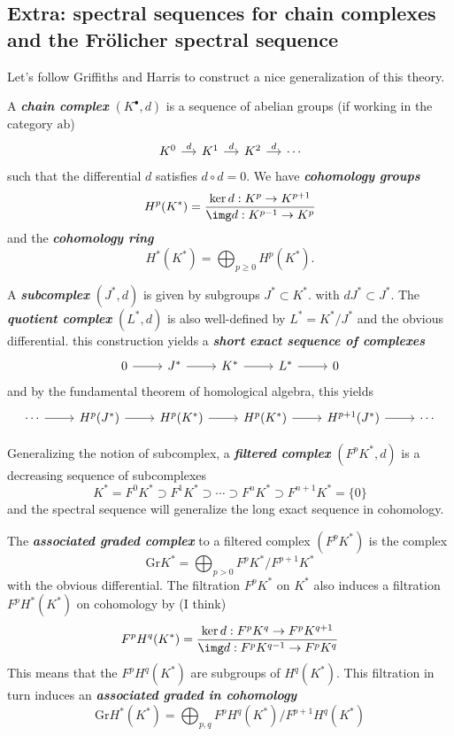 \begin{remark}
\begin{definition}
\subsection{Extra: spectral sequences for chain complexes and the Fr\"olicher spectral sequence}
Let's follow Griffiths and Harris to construct a nice generalization of this theory.

A \textit{\textbf{chain complex}} $(K^\bullet,d)$ is a sequence of abelian groups (if working in the category $\text{ab}$)
\[\begin{tikzcd}[column sep=small]
	K^{0}\arrow[r,"d"]&K^{1}\arrow[r,"d"]&K^2\arrow[r,"d"]&\cdots
\end{tikzcd}\]
such that the differential $d$ satisfies $d\circ d=0$. We have \textit{\textbf{cohomology groups}} 
\[H^{p}(K^*)=\frac{\ker d:K^p\to K^{p+1}}{\img d:K^{p-1}\to K^p}\]
and the \textit{\textbf{cohomology ring}}
\[H^{*}(K^*)=\bigoplus_{p\geq 0} H^{p}(K^*).\]

A \textit{\textbf{subcomplex}} $(J^*,d)$ is given by subgroups $J^*\subset K^*$. with $dJ^*\subset J^*$. The \textit{\textbf{quotient complex}} $(L^*,d)$ is also well-defined by $L^*=K^*/J^*$ and the obvious differential. this construction yields a \textit{\textbf{short exact sequence of complexes}}
\[\begin{tikzcd}
	0\arrow[r]&J^*\arrow[r]&K^*\arrow[r]&L^*\arrow[r]&0
\end{tikzcd}\]
and by the fundamental theorem of homological algebra, this yields
\[\begin{tikzcd}
	\cdots\arrow[r]&H^{p}(J^*)\arrow[r]&H^{p}(K^*)\arrow[r]&H^{p}(K^*)\arrow[r]&H^{p+1}(J^*)\arrow[r]&\cdots
\end{tikzcd}\]

Generalizing the notion of subcomplex, a \textit{\textbf{filtered complex}} $(F^pK^*,d)$ is a decreasing sequence of subcomplexes
\[K^*=F^0K^*\supset F^1K^*\supset\cdots\supset F^nK^*\supset F^{n+1}K^*=\{0\}\]
and the spectral sequence will generalize the long exact sequence in cohomology.

The \textit{\textbf{associated graded complex}} to a filtered complex $ (F^pK^*)$ is the complex
\[\text{Gr}K^*=\bigoplus_{p>0} F^pK^*/F^{p+1}K^* \]
with the obvious differential. The filtration $F^pK^*$ on $K^*$ also induces a filtration $F^pH^*(K^*)$ on cohomology by {\color{blue}(I think)}
\[F^pH^q(K^*)=\frac{\ker d:F^pK^q\to F^pK^{q+1}}{\img d:F^pK^{q-1}\to F^pK^q}\]
This means that the $F^pH^q(K^*)$ are subgroups of $H^{q}(K^*)$. This filtration in turn induces an \textit{\textbf{associated graded in cohomology}}
\[\text{Gr}H^*(K^*)=\bigoplus_{p,q}F^pH^q(K^*)\big/F^{p+1}H^q(K^*)  \]


\end{definition}
\end{remark}
